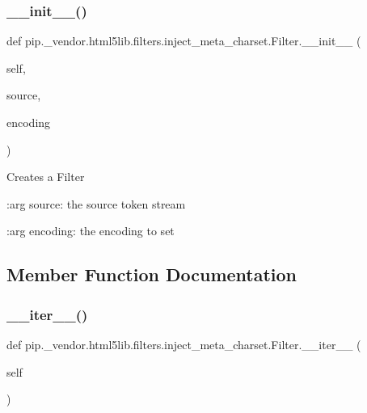 \subsubsection{\texorpdfstring{\+\_\+\+\_\+init\+\_\+\+\_\+()}{\_\_init\_\_()}}
{\footnotesize\ttfamily def pip.\+\_\+vendor.\+html5lib.\+filters.\+inject\+\_\+meta\+\_\+charset.\+Filter.\+\_\+\+\_\+init\+\_\+\+\_\+ (\begin{DoxyParamCaption}\item[{}]{self,  }\item[{}]{source,  }\item[{}]{encoding }\end{DoxyParamCaption})}

\begin{DoxyVerb}Creates a Filter

:arg source: the source token stream

:arg encoding: the encoding to set\end{DoxyVerb}
 

\subsection{Member Function Documentation}
\mbox{\label{classpip_1_1__vendor_1_1html5lib_1_1filters_1_1inject__meta__charset_1_1Filter_abbe5945bb22cdc3f9b109cb06d785f7c}} 
\subsubsection{\texorpdfstring{\+\_\+\+\_\+iter\+\_\+\+\_\+()}{\_\_iter\_\_()}}
{\footnotesize\ttfamily def pip.\+\_\+vendor.\+html5lib.\+filters.\+inject\+\_\+meta\+\_\+charset.\+Filter.\+\_\+\+\_\+iter\+\_\+\+\_\+ (\begin{DoxyParamCaption}\item[{}]{self }\end{DoxyParamCaption})}



